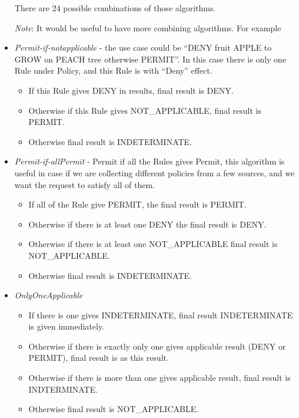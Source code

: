 \documentclass{article}                            %
\begin{document}
\begin{itemize}
    There are 24 possible combinations of those algorithms.

\emph{Note}: It would be useful to have more combining algorithms. For example 

    \item  \emph{Permit-if-notapplicable} - the use case could be ``DENY fruit APPLE to GROW on PEACH tree otherwise PERMIT''. In this case there is only one Rule under Policy, and this Rule is with ``Deny'' effect. 

    \begin{itemize}
        \item If this Rule gives DENY in results, final result is DENY.
        \item Otherwise if this Rule gives NOT\_APPLICABLE, final result is PERMIT.
        \item Otherwise final result is INDETERMINATE. 
    \end{itemize}

    \item  \emph{Permit-if-allPermit} - Permit if all the Rules gives Permit, this algorithm is useful in case if we are collecting different policies from a few sources, and we want the request to satisfy all of them.

    \begin{itemize}
        \item If all of the Rule give PERMIT, the final result is PERMIT.
        \item Otherwise if there is at least one DENY the final result is DENY.
        \item Otherwise if there is at least one NOT\_APPLICABLE final result is NOT\_APPLICABLE.
        \item Otherwise final result is INDETERMINATE.
    \end{itemize}

    \item  \emph{OnlyOneApplicable}

    \begin{itemize}
        \item If there is one gives INDETERMINATE, final result INDETERMINATE is given immediately.
        \item Otherwise if there is exactly only one gives applicable result (DENY or PERMIT), final result is as this result.
        \item Otherwise if there is more than one gives applicable result, final result is INDTERMINATE.
        \item Otherwise final result is NOT\_APPLICABLE.
    \end{itemize}


\end{itemize}
\end{document}

